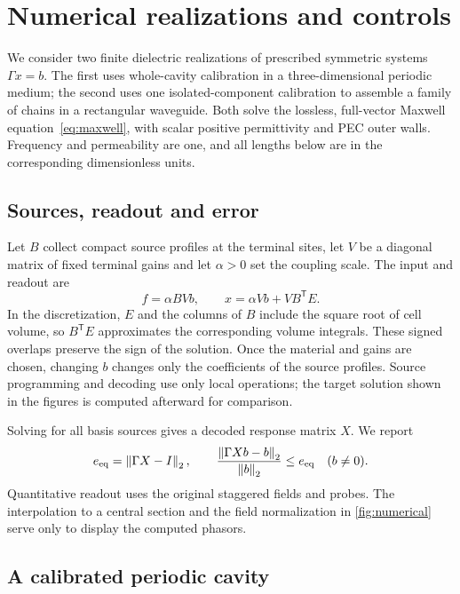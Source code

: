 \section{Numerical realizations and controls}\label{n:sec:numerical}

We consider two finite dielectric realizations of prescribed symmetric systems
$\Gamma x=b$. The first uses whole-cavity calibration in a three-dimensional
periodic medium; the second uses one isolated-component calibration to assemble
a family of chains in a rectangular waveguide. Both solve the lossless,
full-vector Maxwell equation~\eqref{eq:maxwell}, with scalar positive
permittivity and PEC outer walls. Frequency and permeability are one, and all
lengths below are in the corresponding dimensionless units.

\subsection{Sources, readout and error}

Let $B$ collect compact source profiles at the terminal sites, let $V$ be a
diagonal matrix of fixed terminal gains and let $\alpha>0$ set the coupling
scale. The input and readout are
\begin{equation}
 f=\alpha BVb,\qquad x=\alpha Vb+VB^{\mathsf T}E.
 \label{n:eq:source-readout}
\end{equation}
In the discretization, $E$ and the columns of $B$ include the square root of
cell volume, so $B^{\mathsf T}E$ approximates the corresponding volume
integrals. These signed overlaps preserve the sign of the solution. Once the
material and gains are chosen, changing $b$ changes only the coefficients of
the source profiles. Source programming and decoding use only local operations;
the target solution shown in the figures is computed afterward for comparison.

Solving for all basis sources gives a decoded response matrix $X$. We report
\begin{equation}
 e_{\rm eq}=\left\lVert \Gamma X-I\right\rVert_2,
 \qquad
 \frac{\left\lVert \Gamma Xb-b\right\rVert_2}{\left\lVert b\right\rVert_2}\le e_{\rm eq}
 \quad (b\ne0).
 \label{n:eq:error}
\end{equation}
Quantitative readout uses the original staggered fields and probes. The
interpolation to a central section and the field normalization in
\cref{fig:numerical} serve only to display the computed phasors.

\subsection{A calibrated periodic cavity}

